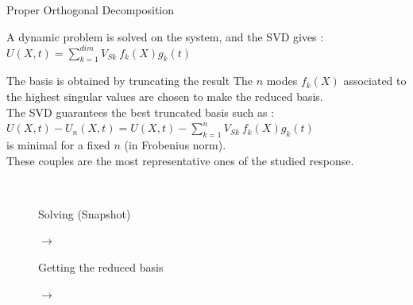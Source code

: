 \documentclass[12pt]{beamer}
\newcommand\FontPOD{\fontsize{10}{12}\selectfont}
\begin{document}
\begin{frame}{Proper Orthogonal Decomposition}
	\FontPOD
	\begin{alertblock}{A dynamic problem is solved on the system, and the SVD gives :}
	$ \displaystyle U(X,t) = \sum_{k=1}^{dim} V_{Sk}~f_k(X) g_k(t)$\\
	\end{alertblock}
		
	\begin{alertblock}{The basis is obtained by truncating the result}
	The $n$ modes $f_k(X)$ associated to the highest 
	singular values are chosen to make the reduced basis.\\
	The SVD guarantees the best truncated basis such as :
	$ \displaystyle U(X,t) - U_n(X,t) = U(X,t) - \sum_{k=1}^{n} V_{Sk}~ f_k(X) g_k(t)$\\
	is minimal for a fixed $n$ (in Frobenius norm).\\
	These couples are the most representative ones of the studied response.
	\end{alertblock}
	\vspace{-0.3cm}
	\begin{figure}
	$~$
	   \begin{minipage}{0.19\linewidth}
			\begin{alertblock}{}
				\centering		
				Solving (Snapshot)
			\end{alertblock}
	   \end{minipage}\hfill
	   \begin{minipage}{0.03\linewidth}
			\vspace{0.220cm}
	   		$\!\!\rightarrow$
	   \end{minipage}\hfill
	   \begin{minipage}{0.19\linewidth}
			\begin{alertblock}{}
				\centering		
				Getting the reduced basis
			\end{alertblock}
	   \end{minipage}
	   \begin{minipage}{0.03\linewidth}
			\vspace{0.220cm}
	   		$\!\!\!\rightarrow$
	   \end{minipage}\hfill
	   \begin{minipage}{0.19\linewidth}
			\begin{alertblock}{}
				\centering		

\end{alertblock}
\end{minipage}
\end{figure}
\end{frame}
\end{document}

